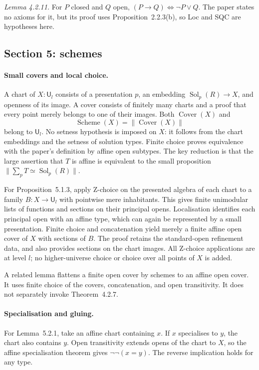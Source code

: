 \documentclass[11pt]{article}
\newcommand{\U}{\mathsf{U}}
\newcommand{\tr}[1]{\lVert #1\rVert}
\theoremstyle{remark}
\begin{document}
\emph{Lemma 4.2.11.} For $P$ closed and $Q$ open,
$(P\to Q)\Leftrightarrow\neg P\vee Q$. The paper states no axioms for it,
but its proof uses Proposition~2.2.3(b), so Loc and SQC are hypotheses
here.

\subsection*{Section 5: schemes}

\paragraph{Small covers and local choice.}
A chart of $X:\U_l$ consists of a presentation $p$, an embedding
$\operatorname{Sol}_p(R)\to X$, and openness of its image. A cover
consists of finitely many charts and a proof that every point merely
belongs to one of their images. Both $\operatorname{Cover}(X)$ and
\[
              \operatorname{Scheme}(X)=\tr{\operatorname{Cover}(X)}
\]
belong to $\U_l$. No setness hypothesis is imposed on $X$: it follows
from the chart embeddings and the setness of solution types.
Finite choice proves equivalence with the paper's definition by affine
open subtypes. The key reduction is that the large assertion that $T$
is affine is equivalent to the small proposition
$\tr{\sum_p T\simeq\operatorname{Sol}_p(R)}$.

For Proposition~5.1.3, apply Z-choice on the presented algebra of each
chart to a family $B:X\to\U_l$ with pointwise mere inhabitants.
This gives finite unimodular lists of functions and sections on their
principal opens. Localisation identifies each principal open with an
affine type, which can again be represented by a small presentation.
Finite choice and concatenation yield merely a finite affine open cover
of $X$ with sections of $B$. The proof retains the standard-open
refinement data, and also provides sections on the chart images.
All Z-choice applications are at level $l$; no higher-universe choice
or choice over all points of $X$ is added.

A related lemma flattens a finite open cover by schemes to an affine
open cover. It uses finite choice of the covers, concatenation, and
open transitivity. It does not separately invoke Theorem~4.2.7.

\paragraph{Specialisation and gluing.}
For Lemma~5.2.1, take an affine chart containing $x$.
If $x$ specialises to $y$, the chart also contains $y$.
Open transitivity extends opens of the chart to $X$, so the affine
specialisation theorem gives $\neg\neg(x=y)$.
The reverse implication holds for any type.
\end{document}
